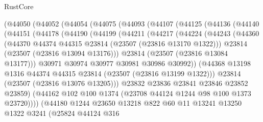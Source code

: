 \begin{lexlean}{RustCore}
\begin{coremodule}
      (@44050
        (@44052
          (@44054
            (@44075
              (@44093
                (@44107
                  (@44125
                    (@44136
                      (@44140
                        (@44151
                          (@44178
                            (@44190
                              (@44199
                                (@44211
                                  (@44217
                                    (@44224
                                      (@44243
                                        (@44360
                                          (@44370
                                            @44374
                                            @44315
                                            @23814
                                            (@23507 (@23816 @13170 @1322)))
                                          @23814
                                          (@23507 (@23816 @13094 @13176)))
                                        @23814
                                        (@23507 (@23816 @13084 @13177)))
                                      @30971
                                      @30974
                                      @30977
                                      @30981
                                      @30986
                                      @30992))
                                  (@44368
                                    @13198
                                    @1316
                                    @44374
                                    @44315
                                    @23814
                                    (@23507 (@23816 @13199 @1322)))
                                  @23814
                                  (@23507 (@23816 @13076 @13205)))
                                @23832
                                @23836
                                @23841
                                @23846
                                @23852
                                @23859)
                              (@44162 @102 @100 @1374 (@23708 @44124 @1244 @98 @100 @1373 @23720))))
                          (@44180
                            @1244
                            @23650
                            @13218
                            @822
                            @60
                            @11
                            @13241
                            @13250
                            @1322
                            @3241
                            (@25824
                              @44124
                              @316

\end{coremodule}
\end{lexlean}
